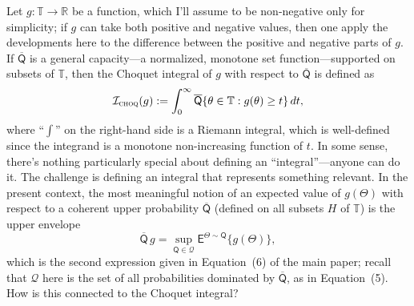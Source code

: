 \documentclass[a4paper, 12pt]{article}
\theoremstyle{plain}
\theoremstyle{definition}
\theoremstyle{remark}
\newcommand{\E}{\mathsf{E}}
\newcommand{\RR}{\mathbb{R}}
\newcommand{\TT}{\mathbb{T}}
\newcommand{\prior}{\mathsf{Q}}
\newcommand{\credal}{\mathscr{Q}}
\newcommand{\uprior}{\overline{\mathsf{Q}}}
\begin{document}
Let $g: \TT \to \RR$ be a function, which I'll assume to be non-negative only for simplicity; if $g$ can take both positive and negative values, then one apply the developments here to the difference between the positive and negative parts of $g$.  If $\uprior$ is a general capacity---a normalized, monotone set function---supported on subsets of $\TT$, then the Choquet integral of $g$ with respect to $\uprior$ is defined as 
\begin{equation}
\label{eq:choquet}
\mathcal{I}_\text{\sc choq}(g) := \int_0^\infty \uprior\{ \theta \in \TT: g(\theta) \geq t \} \, dt, 
\end{equation} 
where ``$\int$'' on the right-hand side is a Riemann integral, which is well-defined since the integrand is a monotone non-increasing function of $t$.  In some sense, there's nothing particularly special about defining an ``integral''---anyone can do it.  The challenge is defining an integral that represents something relevant.  In the present context, the most meaningful notion of an expected value of $g(\Theta)$ with respect to a coherent upper probability $\uprior$ (defined on all subsets $H$ of $\TT$) is the upper envelope 
\[ \uprior\,g = \sup_{\prior \in \credal} \E^{\Theta \sim \prior}\{ g(\Theta) \}, \]
which is the second expression given in Equation~(6) of the main paper; recall that $\credal$ here is the set of all probabilities dominated by $\uprior$, as in Equation~(5).  How is this connected to the Choquet integral?
\end{document}
